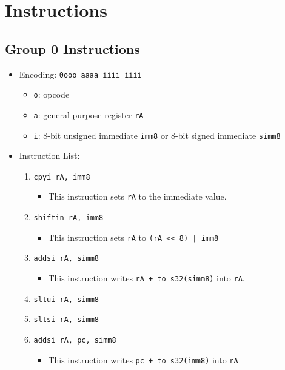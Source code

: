 \documentclass{article}
\begin{document}
\section{Instructions}
	\subsection{Group 0 Instructions}
		\begin{itemize}
		\item Encoding:  \texttt{0ooo aaaa iiii iiii}
			\begin{itemize}
			\item \texttt{o}:  opcode
			\item \texttt{a}:  general-purpose register \texttt{rA}
			\item \texttt{i}:  8-bit unsigned immediate \texttt{imm8} or
				8-bit signed immediate \texttt{simm8}
			\end{itemize}
		\item Instruction List:
			\begin{enumerate}
			\item \texttt{cpyi rA, imm8}
				\begin{itemize}
				\item This instruction sets \texttt{rA} to the immediate
					value.
				\end{itemize}
			\item \texttt{shiftin rA, imm8}
				\begin{itemize}
				\item This instruction sets \texttt{rA} to
					\texttt{(rA << 8) | imm8}
				\end{itemize}
			\item \texttt{addsi rA, simm8}
				\begin{itemize}
				\item This instruction writes \texttt{rA + to\_s32(simm8)}
					into \texttt{rA}.
				\end{itemize}
			\item \texttt{sltui rA, simm8}

			\item \texttt{sltsi rA, simm8}
			\item \texttt{addsi rA, pc, simm8}
				\begin{itemize}
				\item This instruction writes \texttt{pc + to\_s32(imm8)}
					into \texttt{rA}
				\end{itemize}


\end{enumerate}
\end{itemize}
\end{document}
